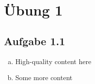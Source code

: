 \documentclass{standalone}
\begin{document}
\section{Übung 1}
\subsection{Aufgabe 1.1}
\begin{enumerate}[a)]
\item
    High-quality content here

\item
    Some more content

\end{enumerate}
\end{document}
